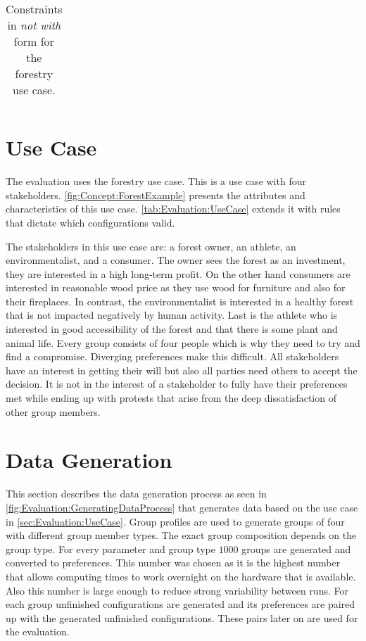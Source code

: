 \begin{table}[tb]
\begin{center}
\begin{tabularx}{\columnwidth}{cl|C|C|C|C|C|C|C|C|C|C|C|C|C|C|C|C|C|C|C|C|C|}
        \end{tabularx}
        \caption[Forestry Use Case: Constraints]{Constraints in \emph{not with} form for the forestry use case.}
        \label{tab:Evaluation:UseCase}
    \end{center}
\end{table}

\section{Use Case}
\label{sec:Evaluation:UseCase}
The evaluation uses the forestry use case. This is a use case with four stakeholders. \autoref{fig:Concept:ForestExample} presents the attributes and characteristics of this use case. \autoref{tab:Evaluation:UseCase} extends it with rules that dictate which configurations valid.

The stakeholders in this use case are: a forest owner, an athlete, an environmentalist, and a consumer. The owner sees the forest as an investment, they are interested in a high long-term profit. On the other hand consumers are interested in reasonable wood price as they use wood for furniture and also for their fireplaces. In contrast, the environmentalist is interested in a healthy forest that is not impacted negatively by human activity. Last is the athlete who is interested in good accessibility of the forest and that there is some plant and animal life.
Every group consists of four people which is why they need to try and find a compromise. Diverging preferences make this difficult. All stakeholders have an interest in getting their will but also all parties need others to accept the decision. It is not in the interest of a stakeholder to fully have their preferences met while ending up with protests that arise from the deep dissatisfaction of other group members.



\section{Data Generation}
\label{sec:Evaluation:GeneratingGroups}

This section describes the data generation process as seen in \autoref{fig:Evaluation:GeneratingDataProcess} that generates data based on the use case in \autoref{sec:Evaluation:UseCase}. Group profiles are used to generate groups of four with different group member types. The exact group composition depends on the group type. For every parameter and group type $1000$ groups are generated and converted to preferences. This number was chosen as it is the highest number that allows computing times to work overnight on the hardware that is available. Also this number is large enough to reduce strong variability between runs. For each group unfinished configurations are generated and its preferences are paired up with the generated unfinished configurations. These pairs later on are used for the evaluation. 

